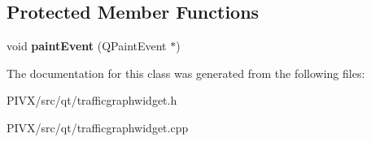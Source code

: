\subsection*{Protected Member Functions}
\begin{DoxyCompactItemize}
\item 
\mbox{\label{class_traffic_graph_widget_a728112be94b731a17ff36136e48adcb2}} 
void {\bfseries paint\+Event} (Q\+Paint\+Event $\ast$)
\end{DoxyCompactItemize}


The documentation for this class was generated from the following files\+:\begin{DoxyCompactItemize}
\item 
P\+I\+V\+X/src/qt/trafficgraphwidget.\+h\item 
P\+I\+V\+X/src/qt/trafficgraphwidget.\+cpp\end{DoxyCompactItemize}
